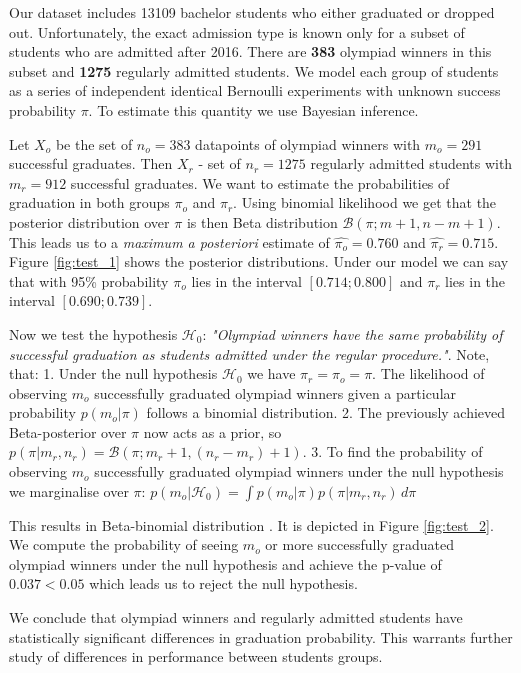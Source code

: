 \documentclass{article}
\begin{document}
Our dataset includes 13109 bachelor students who either graduated or dropped out. Unfortunately, the exact admission type is known only for a subset of students who are admitted after 2016. There are \textbf{383} olympiad winners in this subset and \textbf{1275} regularly admitted students. We model each group of students as a series of independent identical Bernoulli experiments with unknown success probability $\pi$. To estimate this quantity we use Bayesian inference.

Let $X_o$ be the set of $n_o = 383$ datapoints of olympiad winners with $m_o = 291$ successful graduates. Then $X_r$ - set of $n_r = 1275$ regularly admitted students with $m_r = 912$ successful graduates.
We want to estimate the probabilities of graduation in both groups $\pi_o$ and $\pi_r$. Using binomial likelihood we get that the posterior distribution over $\pi$ is then Beta distribution $\mathcal{B}(\pi ; m+1,n-m+1)$. This leads us to a \textit{maximum a posteriori} estimate of
$\hat{\pi_o} = 0.760$ and
$\hat{\pi_r} = 0.715$. Figure \ref{fig:test_1} shows the posterior distributions.
Under our model we can say that with 95\% probability $\pi_o$ lies in the interval $[0.714;0.800]$ and $\pi_r$ lies in the interval $[0.690;0.739]$.

Now we test the hypothesis $\mathcal{H}_0$: \textit{"Olympiad winners have the same probability of successful graduation as students admitted under the regular procedure."}. Note, that: 1. Under the null hypothesis $\mathcal{H}_0$ we have $\pi_r = \pi_o = \pi$. The likelihood of observing $m_o$ successfully graduated olympiad winners given a particular probability $p(m_o| \pi)$ follows a binomial distribution. 2. The previously achieved Beta-posterior over $\pi$ now acts as a prior, so $ p(\pi | m_r, n_r) = \mathcal{B}(\pi;m_r+1, (n_r - m_r) + 1)$. 3. To find the probability of observing $m_o$ successfully graduated olympiad winners under the null hypothesis we marginalise over $\pi$: $p(m_o | \mathcal{H}_0) = \int p(m_o | \pi) p(\pi | m_r, n_r)\,d\pi$

This results in Beta-binomial distribution \cite{hyp_testing}. It is depicted in Figure \ref{fig:test_2}.
We compute the probability of seeing $m_o$ or more successfully graduated olympiad winners under the null hypothesis and achieve the p-value of $0.037 < 0.05$ which leads us to reject the null hypothesis.

We conclude that olympiad winners and regularly admitted students have statistically significant differences in graduation probability. This warrants further study of differences in performance between students groups.
\end{document}
